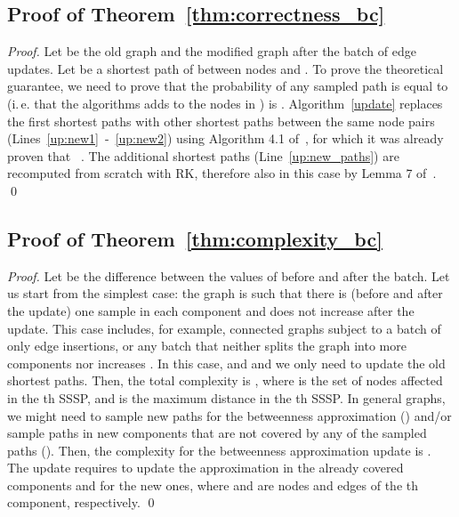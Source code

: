 \documentclass[english]{llncs}
\newcommand{\ie}{i.\,e.\xspace}
\newcommand{\vd}{\xspace}
\newcommand{\rk}{\textsf{RK}\xspace}
\begin{document}
\subsection{Proof of Theorem~\ref{thm:correctness_bc}}
\label{sub:proof_correctness_bc}
\begin{proof}
Let  be the old graph and  the modified graph after the batch of edge updates. Let  be a shortest path of  between nodes  and
. To prove the theoretical guarantee, we need to prove that the probability of any sampled path  is equal to  (\ie that the algorithms adds  to the nodes in ) is .
Algorithm~\ref{update} replaces the first  shortest paths with other shortest paths  between the same node pairs (Lines~\ref{up:new1}~-~\ref{up:new2}) using Algorithm 4.1 of~\cite{DBLP:conf/alenex/BergaminiMS15}, for which it was already proven that ~\cite[Theorem 4.1]{DBLP:conf/alenex/BergaminiMS15}. The additional  shortest paths (Line~\ref{up:new_paths}) are recomputed from scratch with \rk, therefore also in this case  by Lemma 7 of~\cite{DBLP:conf/wsdm/RiondatoK14}.
 \qed
\end{proof}

\subsection{Proof of Theorem~\ref{thm:complexity_bc}}
\label{sub:proof_complexity_bc}
\begin{proof}
Let  be the difference between the values of  before and after the batch. Let us start from the simplest case: the graph  is such that there is (before and after the update) one sample in each component and \vd does not increase after the update. This case includes, for example, connected graphs subject to a batch of only edge insertions, or any batch that neither splits the graph into more components nor increases \vd. In this case,  and  and we only need to update the  old shortest paths. Then, the total complexity is , where  is the set of nodes affected in the th SSSP, and  is the maximum distance in the th SSSP. In general graphs, we might need to sample new paths for the betweenness approximation () and/or sample paths in new components that are not covered by any of the sampled paths (). Then, the complexity for the betweenness approximation update is . The \vd update requires  to update the \vd approximation in the already covered components and  for the new ones, where  and  are nodes and edges of the th component, respectively. \qed
\end{proof}
\end{document}
